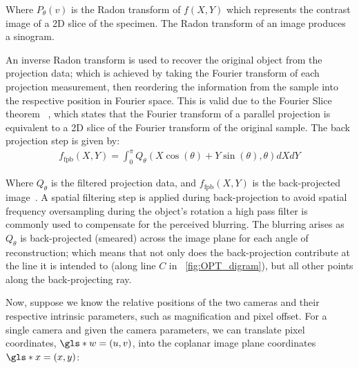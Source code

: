 \documentclass{osa-article}
\begin{document}
Where \(P_\theta(v)\) is the Radon transform of \(f(X,Y)\) which represents the contrast image of a 2D slice of the specimen.
The Radon transform of an image produces a sinogram.%



An inverse Radon transform is used to recover the original object from the projection data; which is achieved by taking the Fourier transform of each projection measurement, then reordering the information from the sample into the respective position in Fourier space.
This is valid due to the Fourier Slice theorem~\cite{bracewellStripIntegrationRadio1956}
, which states that the Fourier transform of a parallel projection is equivalent to a 2D slice of the Fourier transform of the original sample.
The back projection step is given by:
\begin{align}
  f_{\text{fpb}}(X,Y) = \int_{0}^{\pi} Q_\theta (X\cos(\theta)+Y\sin(\theta),\theta)dXdY
\end{align}

Where \(Q_\theta \) is the filtered projection data, and \(f_{\text{fpb}}(X,Y)\) is the back-projected image~\cite{dudgeonMultidimensionalDigitalSignal1984}.
A spatial filtering step is applied during back-projection  to avoid spatial frequency oversampling during the object’s rotation
a high pass filter is commonly used to compensate for the perceived blurring.
The blurring arises as \(Q_\theta \) is back-projected (smeared) across the image plane for each angle of reconstruction; which means that not only does the back-projection contribute at the line it is intended to (along line \(C\) in \figurename~\ref{fig:OPT_digram}), but all other points along the back-projecting ray.


Now, suppose we know the relative positions of the two cameras and their respective intrinsic parameters, such as magnification and pixel offset.
For a single camera and given the camera parameters, we can translate pixel coordinates, \(\gls*{w} = (u, v)\), into the coplanar image plane coordinates \(\gls*{x}=(x, y)\):
\end{document}
